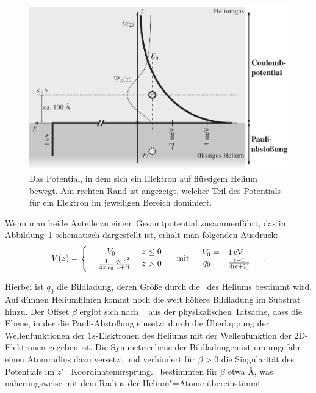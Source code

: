 \begin{figure}[h!tbp]
    \centerline{\includegraphics[width=\bigwidth]{theo_electrons_on_helium/SSE}}
    \caption[Das Potential, in dem sich ein Elektron auf flüssigem Helium bewegt.]{Das Potential, in dem sich ein Elektron auf flüssigem Helium bewegt. Am rechten Rand ist angezeigt, welcher Teil des Potentials für ein Elektron im jeweiligen Bereich dominiert.} 
    \label{fig:potential}
\end{figure}
Wenn man beide Anteile zu einem Gesamtpotential zusammenführt, das in Abbildung~\ref{fig:potential} schematisch dargestellt ist, erhält man folgenden Ausdruck:
    \begin{equation}
        \label{eqn:SSE_Potential}
        V(z)=\left\{\begin{array}{cl}
             V_0 & \;z\leq0\\
            -\frac{1}{4\pi\,\epsilon_0}\frac{q_0\,e^2}{z+\beta} & \;z>0\\
        \end{array}\right.
        \quad\textrm{mit}\quad
        \begin{array}{rl}
            V_0=&\unit[1]{eV}\\
            q_0=&\frac{\epsilon-1}{4(\epsilon+1)}\\
        \end{array}\quad.
    \end{equation}

Hierbei ist $q_0$ die Bildladung, deren Größe durch die \DK\ des Heliums bestimmt wird. Auf dünnen Heliumfilmen kommt noch die weit höhere Bildladung im Substrat hinzu. Der Offset $\beta$ ergibt sich nach  \ea~\cite{Gri74} aus der physikalischen Tatsache, dass die Ebene, in der die Pauli-Abstoßung einsetzt durch die Überlappung der Wellenfunktionen der $1s$-Elektronen des Heliums mit der Wellenfunktion der 2D-Elektronen gegeben ist. Die Symmetrieebene der Bildladungen ist um ungefähr einen Atomradius dazu versetzt und verhindert für $\beta>0$ die Singularität des Potentials im $z$"=Koordinatenursprung.  \ea\  bestimmten für $\beta$ etwa \unit[1]{\AA}, was näherungsweise mit dem Radius der Helium"=Atome übereinstimmt.

